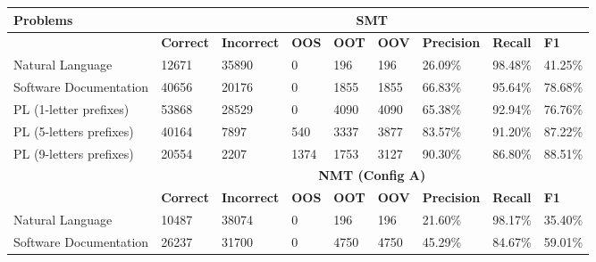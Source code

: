 \begin{table*}[]
\small
\begin{tabular}{|l|l|l|l|l|l|l|l|l|}
\hline
\textbf{Problems}                         & \multicolumn{8}{c|}{\textbf{SMT}}                                                                                                       \\ \hline
\textbf{}                                 & \textbf{Correct} & \textbf{Incorrect} & \textbf{OOS} & \textbf{OOT} & \textbf{OOV} & \textbf{Precision} & \textbf{Recall} & \textbf{F1} \\ \hline
Natural Language                          & 12671            & 35890              & 0            & 196          & 196          & 26.09\%            & 98.48\%         & 41.25\%     \\ \hline
Software Documentation                    & 40656            & 20176              & 0            & 1855         & 1855         & 66.83\%            & 95.64\%         & 78.68\%     \\ \hline
PL (1-letter prefixes)  & 53868            & 28529              & 0            & 4090         & 4090         & 65.38\%            & 92.94\%         & 76.76\%     \\ \hline
PL (5-letters prefixes) & 40164            & 7897               & 540          & 3337         & 3877         & 83.57\%            & 91.20\%         & 87.22\%     \\ \hline
PL (9-letters prefixes) & 20554            & 2207               & 1374         & 1753         & 3127         & 90.30\%            & 86.80\%         & 88.51\%     \\ \hline
                                          & \multicolumn{8}{c|}{\textbf{NMT (Config A)}}                                                                                            \\ \hline
\textbf{}                                 & \textbf{Correct} & \textbf{Incorrect} & \textbf{OOS} & \textbf{OOT} & \textbf{OOV} & \textbf{Precision} & \textbf{Recall} & \textbf{F1} \\ \hline
Natural Language                          & 10487            & 38074              & 0            & 196          & 196          & 21.60\%            & 98.17\%         & 35.40\%     \\ \hline
Software Documentation                    & 26237            & 31700              & 0            & 4750         & 4750         & 45.29\%            & 84.67\%         & 59.01\%     \\ \hline

\end{tabular}
\end{table*}
